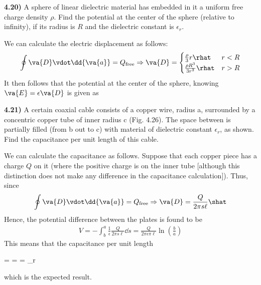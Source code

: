 \documentclass[12pt,a4paper]{article}
\newcommand{\prob}[2]{\textbf{#1)} #2}
\begin{document}
\prob{4.20}{A sphere of linear dielectric material has embedded in it a uniform free charge density $\rho$. Find the potential at the center of the sphere (relative to infinity), if its radius is $R$ and the dielectric constant is $\epsilon_r$.}

We can calculate the electric displacement as follows:
\begin{align*}
\oint \va{D} \vdot \dd{\va{a}} = Q_{\rm free} \Rightarrow \va{D} = \begin{cases}
\frac{\rho}{3}r\rhat & r < R \\
\frac{\rho R^3}{3r^2}\rhat & r > R
\end{cases}
\end{align*}
It then follows that the potential at the center of the sphere, knowing $\va{E} = \epsilon\va{D}$ is given as

\prob{4.21}{A certain coaxial cable consists of a copper wire, radius a, surrounded by a concentric copper tube of inner radius c (Fig. 4.26). The space between is partially filled (from b out to c) with material of dielectric constant $\epsilon_r$, as shown. Find the capacitance per unit length of this cable.}

We can calculate the capacitance as follows. Suppose that each copper piece has a charge $Q$ on it (where the positive charge is on the inner tube [although this distinction does not make any difference in the capacitance calculation]). Thus, since
\begin{align*}
\oint \va{D} \vdot \dd{\va{a}} = Q_{\rm free} \Rightarrow \va{D} = \frac{Q}{2\pi s \ell} \shat
\end{align*}
Hence, the potential difference between the plates is found to be
\begin{align*}
V = -\int_{b}^{a} \frac{1}{\epsilon}\frac{Q}{2\pi s \ell} \dd{s} = \frac{Q}{2\pi\epsilon\pi \ell}\ln(\frac{b}{a})
\end{align*}
This means that the capacitance per unit length
\begin{eqbox}
 =  =  = \epsilon_r
\end{eqbox}
which is the expected result.
\end{document}
